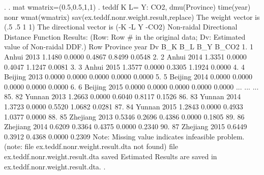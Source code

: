 . 
. mat wmatrix=(0.5,0.5,1,1)
{\smallskip}
. teddf K L= Y: CO2, dmu(Province) time(year) nonr wmat(wmatrix) sav(ex.teddf.nonr.weight.result,replace)
{\smallskip}
 The weight vector is (.5 .5 1 1)
{\smallskip}
 The directional vector is (-K -L Y -CO2)
{\smallskip}
{\smallskip}
 Non-raidal Directional Distance Function Results:
    (Row: Row \# in the original data; Dv: Estimated value of Non-raidal DDF.)
{\smallskip}
     {\TLC}
     {\VBAR} Row       Province   year       Dv      B_K      B_L      B_Y    B_CO2 {\VBAR}
     {\LFTT}
  1. {\VBAR}   1          Anhui   2013   1.1480   0.0000   0.4867   0.8499   0.0548 {\VBAR}
  2. {\VBAR}   2          Anhui   2014   1.3351   0.0000   0.4047   1.1247   0.0081 {\VBAR}
  3. {\VBAR}   3          Anhui   2015   1.3577   0.0000   0.3305   1.1924   0.0000 {\VBAR}
  4. {\VBAR}   4        Beijing   2013   0.0000   0.0000   0.0000   0.0000   0.0000 {\VBAR}
  5. {\VBAR}   5        Beijing   2014   0.0000   0.0000   0.0000   0.0000   0.0000 {\VBAR}
  6. {\VBAR}   6        Beijing   2015   0.0000   0.0000   0.0000   0.0000   0.0000 {\VBAR}
                                     ...
                                     ...
                                     ...
 85. {\VBAR}  82         Yunnan   2013   1.2663   0.0000   0.6040   0.8117   0.1526 {\VBAR}
 86. {\VBAR}  83         Yunnan   2014   1.3723   0.0000   0.5520   1.0682   0.0281 {\VBAR}
 87. {\VBAR}  84         Yunnan   2015   1.2843   0.0000   0.4933   1.0377   0.0000 {\VBAR}
 88. {\VBAR}  85       Zhejiang   2013   0.5346   0.2696   0.4386   0.0000   0.1805 {\VBAR}
 89. {\VBAR}  86       Zhejiang   2014   0.6209   0.3364   0.4375   0.0000   0.2340 {\VBAR}
 90. {\VBAR}  87       Zhejiang   2015   0.6449   0.3912   0.4368   0.0000   0.2309 {\VBAR}
     {\BLC}
Note: Missing value indicates infeasible problem.
(note: file ex.teddf.nonr.weight.result.dta not found)
file ex.teddf.nonr.weight.result.dta saved
{\smallskip}
Estimated Results are saved in ex.teddf.nonr.weight.result.dta.
{\smallskip}
. 
